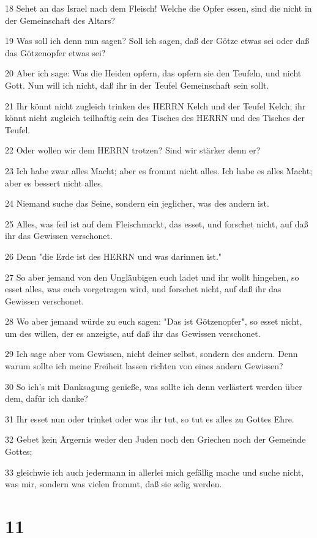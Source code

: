 \par 18 Sehet an das Israel nach dem Fleisch! Welche die Opfer essen, sind die nicht in der Gemeinschaft des Altars?
\par 19 Was soll ich denn nun sagen? Soll ich sagen, daß der Götze etwas sei oder daß das Götzenopfer etwas sei?
\par 20 Aber ich sage: Was die Heiden opfern, das opfern sie den Teufeln, und nicht Gott. Nun will ich nicht, daß ihr in der Teufel Gemeinschaft sein sollt.
\par 21 Ihr könnt nicht zugleich trinken des HERRN Kelch und der Teufel Kelch; ihr könnt nicht zugleich teilhaftig sein des Tisches des HERRN und des Tisches der Teufel.
\par 22 Oder wollen wir dem HERRN trotzen? Sind wir stärker denn er?
\par 23 Ich habe zwar alles Macht; aber es frommt nicht alles. Ich habe es alles Macht; aber es bessert nicht alles.
\par 24 Niemand suche das Seine, sondern ein jeglicher, was des andern ist.
\par 25 Alles, was feil ist auf dem Fleischmarkt, das esset, und forschet nicht, auf daß ihr das Gewissen verschonet.
\par 26 Denn "die Erde ist des HERRN und was darinnen ist."
\par 27 So aber jemand von den Ungläubigen euch ladet und ihr wollt hingehen, so esset alles, was euch vorgetragen wird, und forschet nicht, auf daß ihr das Gewissen verschonet.
\par 28 Wo aber jemand würde zu euch sagen: "Das ist Götzenopfer", so esset nicht, um des willen, der es anzeigte, auf daß ihr das Gewissen verschonet.
\par 29 Ich sage aber vom Gewissen, nicht deiner selbst, sondern des andern. Denn warum sollte ich meine Freiheit lassen richten von eines andern Gewissen?
\par 30 So ich's mit Danksagung genieße, was sollte ich denn verlästert werden über dem, dafür ich danke?
\par 31 Ihr esset nun oder trinket oder was ihr tut, so tut es alles zu Gottes Ehre.
\par 32 Gebet kein Ärgernis weder den Juden noch den Griechen noch der Gemeinde Gottes;
\par 33 gleichwie ich auch jedermann in allerlei mich gefällig mache und suche nicht, was mir, sondern was vielen frommt, daß sie selig werden.

\chapter{11}


